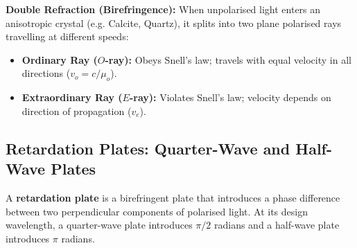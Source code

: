 \documentclass[12pt,a4paper]{article}
\begin{document}
\begin{tcolorbox}[tikzbox, title={Polarisation by Reflection (Brewster's Law)}]
\centering
{}
\end{tcolorbox}

\textbf{Double Refraction (Birefringence):} When unpolarised light enters an anisotropic crystal (e.g. Calcite, Quartz), it splits into two plane polarised rays travelling at different speeds:
\begin{itemize}[leftmargin=*, itemsep=2pt]
  \item \textbf{Ordinary Ray ($O$-ray):} Obeys Snell's law; travels with equal velocity in all directions ($v_o = c/\mu_o$).
  \item \textbf{Extraordinary Ray ($E$-ray):} Violates Snell's law; velocity depends on direction of propagation ($v_e$).
\end{itemize}

\subsection{Retardation Plates: Quarter-Wave and Half-Wave Plates}

\begin{tcolorbox}[defbox, title={Retardation Plate}]
A \textbf{retardation plate} is a birefringent plate that introduces a phase difference between two perpendicular components of polarised light. At its design wavelength, a quarter-wave plate introduces $\pi/2$ radians and a half-wave plate introduces $\pi$ radians.
\end{tcolorbox}
\end{document}
